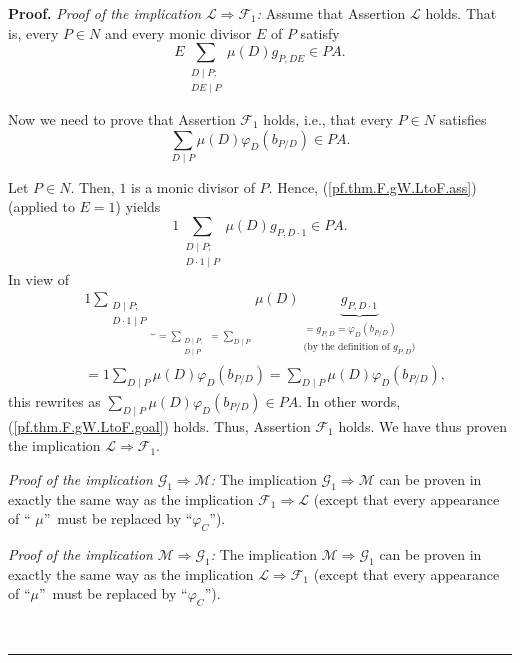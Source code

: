 \documentclass[numbers=enddot,12pt,final,onecolumn,notitlepage]{scrartcl}%
\theoremstyle{definition}
\newenvironment{proof}[1][Proof]{\noindent\textbf{#1.} }{\ \rule{0.5em}{0.5em}}
\let\sumnonlimits\sum
\renewcommand{\sum}{\sumnonlimits\limits}
\begin{document}
\begin{proof}
\textit{Proof of the implication }$\mathcal{L}\Longrightarrow\mathcal{F}_{1}%
$\textit{:} Assume that Assertion $\mathcal{L}$ holds. That is, every $P\in N$
and every monic divisor $E$ of $P$ satisfy%
\begin{equation}
E\sum_{\substack{D\mid P;\\DE\mid P}}\mu\left(  D\right)  g_{P,DE}\in
PA.\label{pf.thm.F.gW.LtoF.ass}%
\end{equation}


Now we need to prove that Assertion $\mathcal{F}_{1}$ holds, i.e., that every
$P\in N$ satisfies%
\begin{equation}
\sum_{D\mid P}\mu\left(  D\right)  \varphi_{D}\left(  b_{P/D}\right)  \in PA.
\label{pf.thm.F.gW.LtoF.goal}%
\end{equation}


Let $P\in N$. Then, $1$ is a monic divisor of $P$. Hence,
(\ref{pf.thm.F.gW.LtoF.ass}) (applied to $E=1$) yields%
\[
1\sum_{\substack{D\mid P;\\D\cdot1\mid P}}\mu\left(  D\right)  g_{P,D\cdot
1}\in PA.
\]
In view of%
\begin{align*}
&  1\underbrace{\sum_{\substack{D\mid P;\\D\cdot1\mid P}}}_{=\sum
_{\substack{D\mid P;\\D\mid P}}=\sum_{D\mid P}}\mu\left(  D\right)
\underbrace{g_{P,D\cdot1}}_{\substack{=g_{P,D}=\varphi_{D}\left(
b_{P/D}\right)  \\\text{(by the definition of }g_{P,D}\text{)}}}\\
&  =1\sum_{D\mid P}\mu\left(  D\right)  \varphi_{D}\left(  b_{P/D}\right)
=\sum_{D\mid P}\mu\left(  D\right)  \varphi_{D}\left(  b_{P/D}\right)  ,
\end{align*}
this rewrites as $\sum_{D\mid P}\mu\left(  D\right)  \varphi_{D}\left(
b_{P/D}\right)  \in PA$. In other words, (\ref{pf.thm.F.gW.LtoF.goal}) holds.
Thus, Assertion $\mathcal{F}_{1}$ holds. We have thus proven the implication
$\mathcal{L}\Longrightarrow\mathcal{F}_{1}$.

\textit{Proof of the implication }$\mathcal{G}_{1}\Longrightarrow\mathcal{M}%
$\textit{:} The implication $\mathcal{G}_{1}\Longrightarrow\mathcal{M}$ can be
proven in exactly the same way as the implication $\mathcal{F}_{1}%
\Longrightarrow\mathcal{L}$ (except that every appearance of \textquotedblleft%
$\mu$\textquotedblright\ must be replaced by \textquotedblleft$\varphi_{C}%
$\textquotedblright).

\textit{Proof of the implication }$\mathcal{M}\Longrightarrow\mathcal{G}_{1}%
$\textit{:} The implication $\mathcal{M}\Longrightarrow\mathcal{G}_{1}$ can be
proven in exactly the same way as the implication $\mathcal{L}\Longrightarrow
\mathcal{F}_{1}$ (except that every appearance of \textquotedblleft$\mu
$\textquotedblright\ must be replaced by \textquotedblleft$\varphi_{C}%
$\textquotedblright).


\end{proof}
\end{document}
